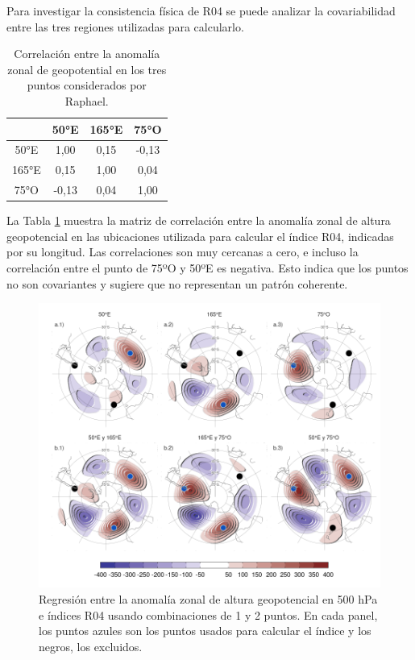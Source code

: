 \documentclass[12pt,oneside,a4paper]{reedthesis}
\begin{document}
Para investigar la consistencia física de R04 se puede analizar la covariabilidad entre las tres regiones utilizadas para calcularlo.

\begin{table}

\caption{\label{tab:raphael-correlation}Correlación entre la anomalía zonal de geopotential en los tres puntos considerados por Raphael.}
\centering
\begin{tabular}[t]{cccc}
\toprule
 & 50°E & 165°E & 75°O\\
\midrule
50°E & 1,00 & 0,15 & -0,13\\
165°E & 0,15 & 1,00 & 0,04\\
75°O & -0,13 & 0,04 & 1,00\\
\bottomrule
\end{tabular}
\end{table}

La Tabla \ref{tab:raphael-correlation} muestra la matriz de correlación entre la anomalía zonal de altura geopotencial en las ubicaciones utilizada para calcular el índice R04, indicadas por su longitud.
Las correlaciones son muy cercanas a cero, e incluso la correlación entre el punto de 75ºO y 50ºE es negativa.
Esto indica que los puntos no son covariantes y sugiere que no representan un patrón coherente.

\begin{figure}

{\centering \includegraphics{figures/15-onda3/cor-puntos-1} 

}

\caption{Regresión entre la anomalía zonal de altura geopotencial en 500 hPa e índices R04 usando combinaciones de 1 y 2 puntos. En cada panel, los puntos azules son los puntos usados para calcular el índice y los negros, los excluidos.}\label{fig:cor-puntos}
\end{figure}
\end{document}
